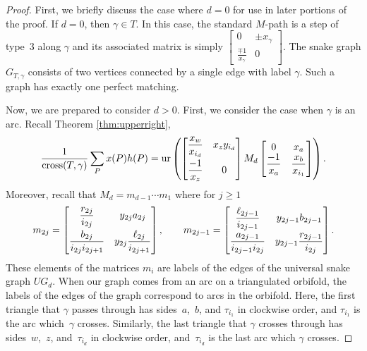 \begin{proof}First, we briefly discuss the case where $d=0$ for use in later portions of the proof. If $d = 0$, then $\gamma \in T$. In this case, the standard $M$-path is a step of type~3 along $\gamma$ and its associated matrix is simply $\left[\begin{smallmatrix} 0 & \pm x_\gamma \\ \frac{\mp 1}{x_\gamma} & 0 \end{smallmatrix}\right]$. The snake graph $G_{T,\gamma}$ consists of two vertices connected by a single edge with label $\gamma$. Such a graph has exactly one perfect matching.

Now, we are prepared to consider $d > 0$. First, we consider the case when $\gamma$ is an arc. Recall Theorem \ref{thm:upperright}, \[\frac{1}{{\rm cross}(T,\gamma)} \sum_P x(P) h(P)
=
{\rm ur} \left( \begin{bmatrix} \dfrac{x_w}{x_{i_d}} & x_z y_{i_d} \vspace{1mm}\\ \dfrac{-1}{x_z} & 0 \end{bmatrix} M_d \begin{bmatrix} 0 & x_a \\ \dfrac{-1}{x_a} & \dfrac{x_b}{x_{i_1}} \end{bmatrix}\right).\] Moreover, recall that $M_d = m_{d-1} \cdots m_1$ where for $j \geq 1$\[
m_{2j} = \begin{bmatrix}\dfrac{r_{2j}}{i_{2j}} & y_{2j} a_{2j} \vspace{1mm}\\ \dfrac{b_{2j}}{i_{2j}i_{2j+1}} & y_{2j} \dfrac{\ell_{2j}}{i_{2j+1}} \end{bmatrix}, \qquad m_{2j-1} = \begin{bmatrix} \dfrac{\ell_{2j-1}}{i_{2j-1}} & y_{2j-1} b_{2j-1} \vspace{1mm}\\ \dfrac{a_{2j-1}}{i_{2j-1}i_{2j}} & y_{2j-1} \dfrac{r_{2j-1}}{i_{2j}} \end{bmatrix}.
\] These elements of the matrices $m_i$ are labels of the edges of the universal snake graph $UG_d$. When our graph comes from an arc on a triangulated orbifold, the labels of the edges of the graph correspond to arcs in the orbifold. Here, the first triangle that $\gamma$ passes through has sides~$a$,~$b$, and $\tau_{i_1}$ in clockwise order, and $\tau_{i_1}$ is the arc which~$\gamma$ crosses. Similarly, the last triangle that $\gamma$ crosses through has sides~$w$,~$z$, and~$\tau_{i_d}$ in clockwise order, and~$\tau_{i_d}$ is the last arc which $\gamma$ crosses.


\end{proof}
